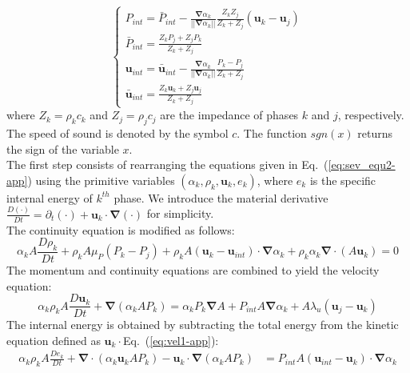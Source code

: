\documentclass[preprint,10pt]{elsarticle}
\renewcommand{\div}{\mbold{\nabla}\! \cdot \!}
\newcommand{\grad}{\mbold{\nabla}}
\newcommand{\mbold}[1]{\boldsymbol#1}
\newcommand{\eqt}[1]{Eq.~(\ref{#1})}                     %
\begin{document}
\begin{appendices}
\begin{equation}
\label{eq:sev_equ2-app}
\left\{
\begin{array}{lll}
P_{int} = \bar{P}_{int} - \frac{\grad \alpha_k}{|| \grad \alpha_k ||} \frac{Z_k Z_j}{Z_k + Z_j} \left( \mbold u_k-\mbold u_j \right) \\
\bar{P}_{int} = \frac{Z_k P_j + Z_j P_k}{Z_k + Z_j} \\
\mbold u_{int} = \bar{\mbold u}_{int} - \frac{\grad \alpha_k}{|| \grad \alpha_k ||} \frac{P_k - P_j}{Z_k + Z_j} \\
\bar{\mbold u}_{int} = \frac{Z_k \mbold u _k + Z_j \mbold u_j}{Z_k + Z_j}
\end{array}
\right.
\end{equation}
where $Z_k = \rho_k c_k$ and $Z_j = \rho_j c_j$ are the impedance of phases $k$ and $j$, respectively. The speed of sound is denoted by the symbol $c$. The function $sgn(x)$ returns the sign of the variable $x$.\\
The first step consists of rearranging the equations given in \eqt{eq:sev_equ2-app} using the primitive variables $(\alpha_k, \rho_k, \mbold u_k, e_k)$, where $e_k$ is the specific internal energy of $k^{th}$ phase. We introduce the material derivative $\frac{D (\cdot)}{Dt} = \partial_t (\cdot) + \mbold u_k \cdot \grad (\cdot)$ for simplicity. \\
The continuity equation is modified as follows:
\begin{equation}
\label{eq:cont1-app}
\alpha_k A \frac{D \rho_k}{Dt} + \rho_k A \mu_P \left( P_k-P_j \right) + \rho_k A \left( \mbold u_k-\mbold u_{int} \right) \cdot \grad \alpha_k + \rho_k \alpha_k \div \left( A \mbold u_k \right) = 0
\end{equation}
The momentum and continuity equations are combined to yield the velocity equation:
\begin{equation}
\label{eq:vel1-app}
\alpha_k \rho_k A \frac{D\mbold u_k}{Dt} + \grad \left( \alpha_k A P_k \right) = \alpha_k P_k \grad A + P_{int} A \grad \alpha_k + A \lambda_u \left( \mbold u_j-\mbold u_k \right)
\end{equation}
The internal energy is obtained by subtracting the total energy from the kinetic equation defined as $\mbold u_k \cdot $\eqt{eq:vel1-app}:
\begin{align}\label{eq:internal1}
\alpha_k \rho_k A \frac{D e_k}{Dt} + \div\left( \alpha_k \mbold u_k A P_k \right) - \mbold u_k \cdot \grad \left( \alpha_k A P_k \right) &= P_{int} A \left(\mbold u_{int}-\mbold u_k \right) \cdot \grad \alpha_k \nonumber \\

\end{align}
\end{appendices}
\end{document}
